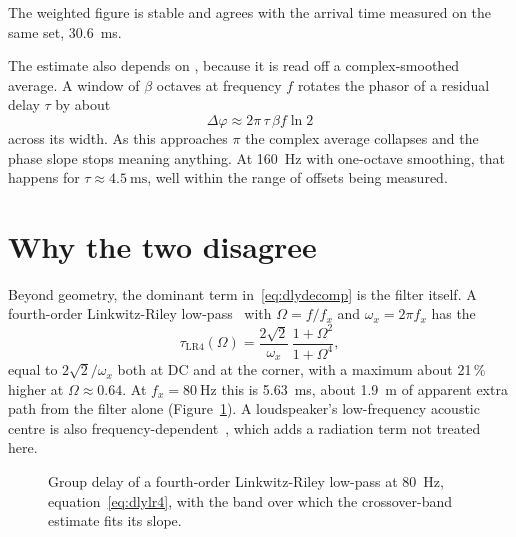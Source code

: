 \noindent The weighted figure is stable and agrees with the arrival time measured on the same set, \SI{30.6}{\milli\second}.

The estimate also depends on , because it is read off a complex-smoothed average. A window of $\beta$ octaves at frequency $f$ rotates the phasor of a residual delay $\tau$ by about
\begin{equation}
  \Delta\varphi \approx 2\pi\,\tau\,\beta f \ln 2
  \label{eq:dlysmooth}
\end{equation}
across its width. As this approaches $\pi$ the complex average collapses and the phase slope stops meaning anything. At \SI{160}{\hertz} with one-octave smoothing, that happens for $\tau \approx \SI{4.5}{\milli\second}$, well within the range of offsets being measured.

\section{Why the two disagree}
Beyond geometry, the dominant term in~\eqref{eq:dlydecomp} is the  filter itself. A fourth-order Linkwitz-Riley low-pass~\cite{Linkwitz1976} with $\Omega = f/f_x$ and $\omega_x = 2\pi f_x$ has the 
\begin{equation}
  \tau_{\mathrm{LR4}}(\Omega) = \frac{2\sqrt{2}}{\omega_x}\,\frac{1+\Omega^2}{1+\Omega^4},
  \label{eq:dlylr4}
\end{equation}
equal to $2\sqrt{2}/\omega_x$ both at DC and at the corner, with a maximum about 21\,\% higher at $\Omega \approx 0.64$. At $f_x = \SI{80}{\hertz}$ this is \SI{5.63}{\milli\second}, about \SI{1.9}{\metre} of apparent extra path from the filter alone (Figure~\ref{fig:dlylr4}). A loudspeaker's low-frequency acoustic centre is also frequency-dependent~\cite{Vanderkooy2006}, which adds a radiation term not treated here.

\begin{figure}[ht]
\centering
{}
\caption{Group delay of a fourth-order Linkwitz-Riley low-pass at \SI{80}{\hertz},
equation~\eqref{eq:dlylr4}, with the band over which the crossover-band estimate
fits its slope.}
\label{fig:dlylr4}
\end{figure}

